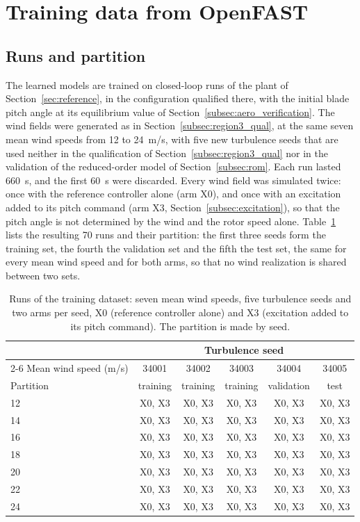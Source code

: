 \section{Training data from OpenFAST}
\label{sec:data}

\subsection{Runs and partition}
\label{subsec:data_runs}
{\color{revQ1}
The learned models are trained on closed-loop runs of the plant of Section~\ref{sec:reference}, in the configuration qualified there, with the initial blade pitch angle at its equilibrium value of Section~\ref{subsec:aero_verification}. The wind fields were generated as in Section~\ref{subsec:region3_qual}, at the same seven mean wind speeds from 12 to 24~m/s, with five new turbulence seeds that are used neither in the qualification of Section~\ref{subsec:region3_qual} nor in the validation of the reduced-order model of Section~\ref{subsec:rom}. Each run lasted 660~s, and the first 60~s were discarded. Every wind field was simulated twice: once with the reference controller alone (arm X0), and once with an excitation added to its pitch command (arm X3, Section~\ref{subsec:excitation}), so that the pitch angle is not determined by the wind and the rotor speed alone. Table~\ref{tab:E4_matrix} lists the resulting 70 runs and their partition: the first three seeds form the training set, the fourth the validation set and the fifth the test set, the same for every mean wind speed and for both arms, so that no wind realization is shared between two sets.
}

\begin{table}[htbp]
\centering
\caption{{\color{revQ1}Runs of the training dataset: seven mean wind speeds, five turbulence seeds and two arms per seed, X0 (reference controller alone) and X3 (excitation added to its pitch command). The partition is made by seed.}}
\label{tab:E4_matrix}
\begin{tabular}{lccccc}
\toprule
 & \multicolumn{5}{c}{Turbulence seed} \\
\cmidrule(lr){2-6}
Mean wind speed (m/s) & 34001 & 34002 & 34003 & 34004 & 34005 \\
Partition & training & training & training & validation & test \\
\midrule
12 & X0, X3 & X0, X3 & X0, X3 & X0, X3 & X0, X3 \\
14 & X0, X3 & X0, X3 & X0, X3 & X0, X3 & X0, X3 \\
16 & X0, X3 & X0, X3 & X0, X3 & X0, X3 & X0, X3 \\
18 & X0, X3 & X0, X3 & X0, X3 & X0, X3 & X0, X3 \\
20 & X0, X3 & X0, X3 & X0, X3 & X0, X3 & X0, X3 \\
22 & X0, X3 & X0, X3 & X0, X3 & X0, X3 & X0, X3 \\
24 & X0, X3 & X0, X3 & X0, X3 & X0, X3 & X0, X3 \\
\bottomrule
\end{tabular}
\end{table}

